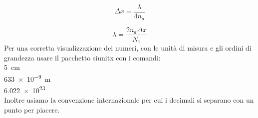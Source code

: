 \documentclass[a4paper,11pt]{article}
\begin{document}
	\label{interf} %
	\label{strum} %
	\label{calib} %
	\label{lambda} %
	
	\begin{equation}\label{delta}
	\Delta x = \dfrac{\lambda}{4n_a}
	\end{equation}
	
	\begin{equation}\label{\lambda}
	\lambda=\dfrac{2n_a\Delta x}{N_1}		
	\end{equation}
	Per una corretta visualizzazione dei numeri, con le unità di misura e gli ordini di grandezza usare il pacchetto siunitx con i comandi:\\
	
		\SI{5}{\centi\meter}
	\\
		\SI{633e-9}{\meter}
	\\
		\num{6.022e23}
	\\
	Inoltre usiamo la convenzione internazionale per cui i decimali si separano con un punto per piacere.
	

	
\end{document}
